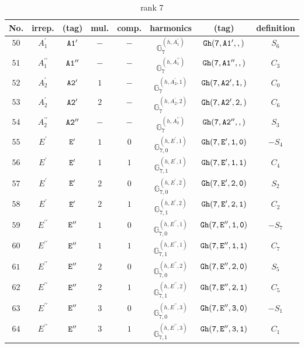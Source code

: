 \documentclass[fleqn,8pt]{jsarticle}
\begin{document}
\begin{table}[ht!]
\begin{center}
\caption{rank 7}
\renewcommand{\arraystretch}{1.3}
\begin{tabular}{cccccccc} \hline \hline
No. & irrep. & (tag) & mul. & comp. & harmonics & (tag) & definition \\ \hline
$ 50 $ & $ A_{1}^{\prime} $ & $ {\tt A1'} $ & $ - $ & $ - $ & $ \mathbb{G}_{7}^{(h,A_{1}^{\prime})} $ & $ {\tt Gh(7,A1',,)} $ & $ S_{6} $ \\
$ 51 $ & $ A_{1}^{\prime\prime} $ & $ {\tt A1''} $ & $ - $ & $ - $ & $ \mathbb{G}_{7}^{(h,A_{1}^{\prime\prime})} $ & $ {\tt Gh(7,A1'',,)} $ & $ C_{3} $ \\
$ 52 $ & $ A_{2}^{\prime} $ & $ {\tt A2'} $ & $ 1 $ & $ - $ & $ \mathbb{G}_{7}^{(h,A_{2}^{\prime},1)} $ & $ {\tt Gh(7,A2',1,)} $ & $ C_{0} $ \\
$ 53 $ & $ A_{2}^{\prime} $ & $ {\tt A2'} $ & $ 2 $ & $ - $ & $ \mathbb{G}_{7}^{(h,A_{2}^{\prime},2)} $ & $ {\tt Gh(7,A2',2,)} $ & $ C_{6} $ \\
$ 54 $ & $ A_{2}^{\prime\prime} $ & $ {\tt A2''} $ & $ - $ & $ - $ & $ \mathbb{G}_{7}^{(h,A_{2}^{\prime\prime})} $ & $ {\tt Gh(7,A2'',,)} $ & $ S_{3} $ \\
$ 55 $ & $ E^{\prime} $ & $ {\tt E'} $ & $ 1 $ & $ 0 $ & $ \mathbb{G}_{7,0}^{(h,E^{\prime},1)} $ & $ {\tt Gh(7,E',1,0)} $ & $ - S_{4} $ \\
$ 56 $ & $ E^{\prime} $ & $ {\tt E'} $ & $ 1 $ & $ 1 $ & $ \mathbb{G}_{7,1}^{(h,E^{\prime},1)} $ & $ {\tt Gh(7,E',1,1)} $ & $ C_{4} $ \\
$ 57 $ & $ E^{\prime} $ & $ {\tt E'} $ & $ 2 $ & $ 0 $ & $ \mathbb{G}_{7,0}^{(h,E^{\prime},2)} $ & $ {\tt Gh(7,E',2,0)} $ & $ S_{2} $ \\
$ 58 $ & $ E^{\prime} $ & $ {\tt E'} $ & $ 2 $ & $ 1 $ & $ \mathbb{G}_{7,1}^{(h,E^{\prime},2)} $ & $ {\tt Gh(7,E',2,1)} $ & $ C_{2} $ \\
$ 59 $ & $ E^{\prime\prime} $ & $ {\tt E''} $ & $ 1 $ & $ 0 $ & $ \mathbb{G}_{7,0}^{(h,E^{\prime\prime},1)} $ & $ {\tt Gh(7,E'',1,0)} $ & $ - S_{7} $ \\
$ 60 $ & $ E^{\prime\prime} $ & $ {\tt E''} $ & $ 1 $ & $ 1 $ & $ \mathbb{G}_{7,1}^{(h,E^{\prime\prime},1)} $ & $ {\tt Gh(7,E'',1,1)} $ & $ C_{7} $ \\
$ 61 $ & $ E^{\prime\prime} $ & $ {\tt E''} $ & $ 2 $ & $ 0 $ & $ \mathbb{G}_{7,0}^{(h,E^{\prime\prime},2)} $ & $ {\tt Gh(7,E'',2,0)} $ & $ S_{5} $ \\
$ 62 $ & $ E^{\prime\prime} $ & $ {\tt E''} $ & $ 2 $ & $ 1 $ & $ \mathbb{G}_{7,1}^{(h,E^{\prime\prime},2)} $ & $ {\tt Gh(7,E'',2,1)} $ & $ C_{5} $ \\
$ 63 $ & $ E^{\prime\prime} $ & $ {\tt E''} $ & $ 3 $ & $ 0 $ & $ \mathbb{G}_{7,0}^{(h,E^{\prime\prime},3)} $ & $ {\tt Gh(7,E'',3,0)} $ & $ - S_{1} $ \\
$ 64 $ & $ E^{\prime\prime} $ & $ {\tt E''} $ & $ 3 $ & $ 1 $ & $ \mathbb{G}_{7,1}^{(h,E^{\prime\prime},3)} $ & $ {\tt Gh(7,E'',3,1)} $ & $ C_{1} $ \\
 \hline \hline
\end{tabular}
\end{center}
\end{table}
\end{document}
